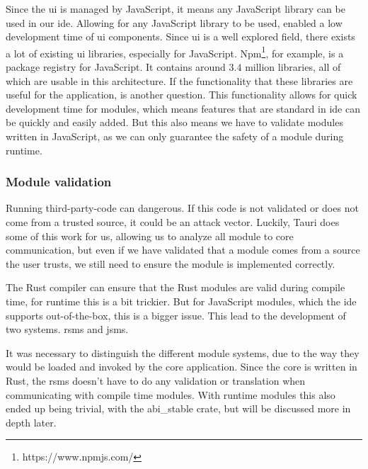 Since the \gls*{ui} is managed by JavaScript, it means any JavaScript library
can be used in our \gls*{ide}. Allowing for any JavaScript library to be used,
enabled a low development time of \gls*{ui} components. Since \gls*{ui} is a
well explored field, there exists a lot of existing \gls*{ui} libraries,
especially for JavaScript. Npm\footnote{https://www.npmjs.com/}, for example, is
a package registry for JavaScript. It contains around $3.4$ million libraries,
all of which are usable in this architecture. If the functionality that these
libraries are useful for the application, is another question. This
functionality allows for quick development time for modules, which means
features that are standard in \gls*{ide} can be quickly and easily added. But
this also means we have to validate modules written in JavaScript, as we can
only guarantee the safety of a module during runtime.


\subsubsection{Module validation}

Running third-party-code can dangerous. If this code is not validated or does
not come from a trusted source, it could be an attack vector. Luckily, Tauri
does some of this work for us, allowing us to analyze all module to core
communication, but even if we have validated that a module comes from a source
the user trusts, we still need to ensure the module is implemented correctly.

The Rust compiler can ensure that the Rust modules are valid during compile
time, for runtime this is a bit trickier. But for JavaScript modules, which the
\gls*{ide} supports out-of-the-box, this is a bigger issue. This lead to the
development of two systems. \gls*{rsms} and \gls*{jsms}.

It was necessary to distinguish the different module systems, due to the way
they would be loaded and invoked by the core application. Since the core is
written in Rust, the \gls*{rsms} doesn't have to do any validation or
translation when communicating with compile time modules. With runtime modules
this also ended up being trivial, with the abi\_stable crate, but will be
discussed more in depth later.

